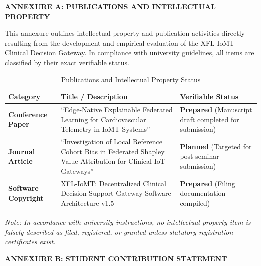 \documentclass[12pt,a4paper,oneside]{report}
\begin{document}
\clearpage
\begin{center}
{\fontsize{14pt}{18pt}\bfseries\selectfont ANNEXURE A: PUBLICATIONS AND INTELLECTUAL PROPERTY}\\[1.5em]
\end{center}

This annexure outlines intellectual property and publication activities directly resulting from the development and empirical evaluation of the XFL-IoMT Clinical Decision Gateway. In compliance with university guidelines, all items are classified by their exact verifiable status.

\begin{table}[H]
\centering
\caption{Publications and Intellectual Property Status}
\label{tab:annexure_a}
\begin{tabularx}{\textwidth}{p{3.2cm} X p{3.2cm}}
\toprule
\textbf{Category} & \textbf{Title / Description} & \textbf{Verifiable Status} \\
\midrule
\textbf{Conference Paper} & ``Edge-Native Explainable Federated Learning for Cardiovascular Telemetry in IoMT Systems'' & \textbf{Prepared} (Manuscript draft completed for submission) \\
\midrule
\textbf{Journal Article} & ``Investigation of Local Reference Cohort Bias in Federated Shapley Value Attribution for Clinical IoT Gateways'' & \textbf{Planned} (Targeted for post-seminar submission) \\
\midrule
\textbf{Software Copyright} & XFL-IoMT: Decentralized Clinical Decision Support Gateway Software Architecture v1.5 & \textbf{Prepared} (Filing documentation compiled) \\
\bottomrule
\end{tabularx}
\end{table}

\textit{Note: In accordance with university instructions, no intellectual property item is falsely described as filed, registered, or granted unless statutory registration certificates exist.}

\clearpage
\begin{center}
{\fontsize{14pt}{18pt}\bfseries\selectfont ANNEXURE B: STUDENT CONTRIBUTION STATEMENT}\\[1.5em]
\end{center}
\end{document}
